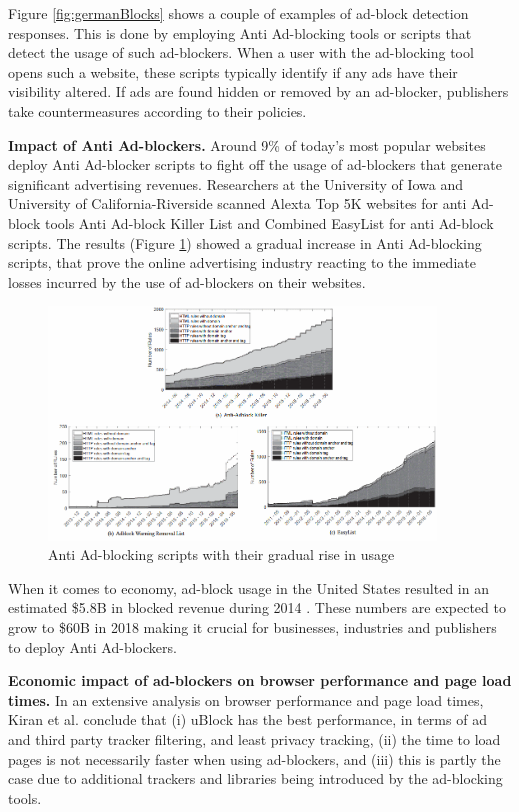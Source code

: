 \documentclass[runningheads,a4paper]{llncs}
\begin{document}
Figure \ref{fig:germanBlocks} shows a couple of examples of ad-block detection responses. This is done by employing Anti Ad-blocking tools or scripts that detect the usage of such ad-blockers. When a user with the ad-blocking tool opens such a website, these scripts typically identify if any ads have their visibility altered. If ads are found hidden or removed by an ad-blocker, publishers take countermeasures according to their policies.

\textbf{Impact of Anti Ad-blockers.} Around 9\% of today's most popular websites \cite{Shitong2017} deploy Anti Ad-blocker scripts to fight off the usage of ad-blockers that generate significant advertising revenues. Researchers at the University of Iowa and University of California-Riverside scanned Alexta Top 5K websites for anti Ad-block tools Anti Ad-block Killer List \cite{aakl} and Combined EasyList for anti Ad-block scripts. The results (Figure \ref{fig:anti-study}) showed a gradual increase in Anti Ad-blocking scripts, that prove the online advertising industry reacting to the immediate losses incurred by the use of ad-blockers on their websites.

\begin{figure}
\centering
\includegraphics[height=6.2cm]{anti-study}
\caption{Anti Ad-blocking scripts with their gradual rise in usage \cite{popAnti2018}}
\label{fig:anti-study}
\end{figure}

When it comes to economy, ad-block usage in the United States resulted in an estimated \$5.8B in blocked revenue during 2014 \cite{costBlock}. These numbers are expected to grow to \$60B in 2018 making it crucial for businesses, industries and publishers to deploy Anti Ad-blockers.

\textbf{Economic impact of ad-blockers on browser performance and page load times.} In an extensive analysis on browser performance and page load times, Kiran et al.  \cite{Kiran2017} conclude that (i) uBlock has the best performance, in terms of ad and third party tracker filtering, and least privacy tracking, (ii) the time to load pages is not necessarily faster when using ad-blockers, and (iii) this is partly the case due to additional trackers and libraries being introduced by the ad-blocking tools.
\end{document}
